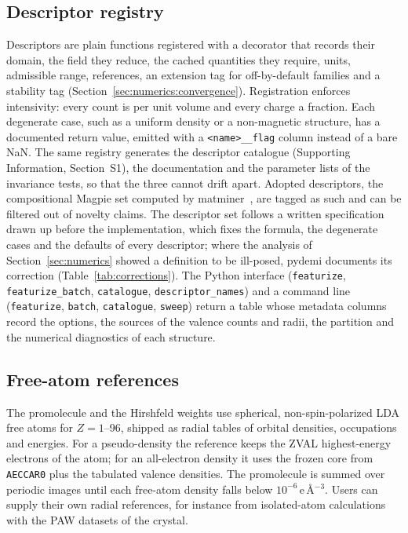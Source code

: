 \documentclass[11pt,a4paper]{article}
\begin{document}
\subsection{Descriptor registry}
Descriptors are plain functions registered with a decorator that records their
domain, the field they reduce, the cached quantities they require, units,
admissible range, references, an extension tag for off-by-default families and
a stability tag (Section~\ref{sec:numerics:convergence}). Registration enforces
intensivity: every count is per unit volume and every charge a fraction. Each
degenerate case, such as a uniform density or a non-magnetic structure, has a
documented return value, emitted with a \texttt{<name>\_\_flag} column instead
of a bare NaN. The same registry generates the descriptor catalogue
(Supporting Information, Section~S1), the documentation and the parameter
lists of the invariance tests, so that the three cannot drift apart. Adopted
descriptors, the compositional Magpie set computed by
matminer~\cite{ward2016,ward2018}, are tagged as such and can be filtered out
of novelty claims. The descriptor set follows a written specification drawn up before the
implementation, which fixes the formula, the degenerate cases and the defaults
of every descriptor; where the analysis of Section~\ref{sec:numerics} showed a
definition to be ill-posed, pydemi documents its correction
(Table~\ref{tab:corrections}). The Python interface (\texttt{featurize},
\texttt{featurize\_batch}, \texttt{catalogue}, \texttt{descriptor\_names}) and a
command line (\texttt{featurize}, \texttt{batch}, \texttt{catalogue},
\texttt{sweep}) return a table whose metadata columns record the options, the
sources of the valence counts and radii, the partition and the numerical
diagnostics of each structure.

\subsection{Free-atom references}
The promolecule and the Hirshfeld weights use spherical, non-spin-polarized
LDA free atoms for $Z=1$--96, shipped as radial tables of orbital densities,
occupations and energies. For a pseudo-density the reference keeps the ZVAL
highest-energy electrons of the atom; for an all-electron density it uses the
frozen core from \texttt{AECCAR0} plus the tabulated valence densities. The
promolecule is summed over periodic images until each free-atom density falls
below $10^{-6}$\,e\,\AA$^{-3}$. Users can supply their own radial references,
for instance from isolated-atom calculations with the PAW datasets of the
crystal.
\end{document}
